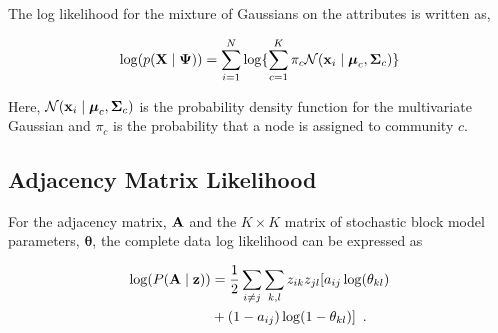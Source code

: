The log likelihood for the mixture of Gaussians on the attributes is written as,

\begin{equation}
\log(p({\bf X} \mid {\boldsymbol \Psi}))=\sum_{i=1}^{N}\log\{\sum_{c=1}^{K}\pi_{c}\mathcal{N}({\bf x}_{i}\mid {\boldsymbol \mu}_{c},{\boldsymbol \Sigma}_{c})   \}
\end{equation}

%
Here, $\mathcal{N}({\bf x}_{i} \mid {\boldsymbol \mu}_{c},{\boldsymbol \Sigma}_{c})$ is the probability density function for the multivariate Gaussian and $\pi_{c}$ is the probability that a node is assigned to community $c$.

\subsection{Adjacency Matrix Likelihood}
For the adjacency matrix, ${\bf A}$ and the $K \times K$ matrix of stochastic block model parameters, ${\boldsymbol \theta}$, the complete data log likelihood can be expressed as

\begin{equation}
\begin{split}
\log(P({\bf A} \mid {\bf z}))&=\frac{1}{2}\sum_{i\ne j}\sum_{k,l}z_{ik}z_{jl}[a_{ij}\log (\theta_{kl})\\
&+(1-a_{ij})\log(1-\theta_{kl})]\enspace. 
\end{split}
\end{equation}



